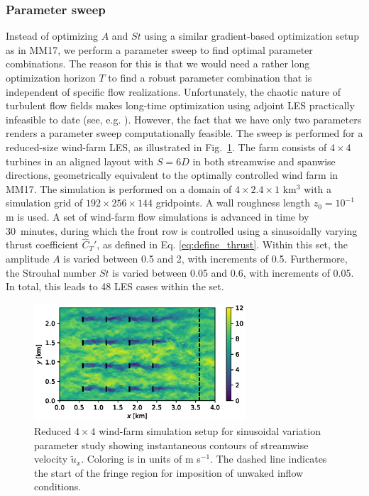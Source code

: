 \documentclass[wes, manuscript]{copernicus}
\begin{document}
\subsubsection{Parameter sweep}
Instead of optimizing $A$ and $St$ using a similar gradient-based optimization setup as in MM17, we perform a parameter sweep to find optimal parameter combinations. The reason for this is that we would need a rather long optimization horizon $T$ to find a robust parameter combination that is independent of specific flow realizations. Unfortunately, the chaotic nature of turbulent flow fields makes long-time optimization using adjoint LES practically infeasible to date (see, e.g. \citealp{wang2014least}). However, the fact that we have only two parameters renders a parameter sweep computationally feasible. The sweep is performed for a reduced-size wind-farm LES, as illustrated in Fig.~\ref{fig:sinus_setup}. The farm consists of $4 \times 4$ turbines in an aligned layout with $S = 6D$ in both streamwise and spanwise directions, geometrically equivalent to the optimally controlled wind farm in MM17. The simulation is performed on a domain of $4 \times 2.4 \times 1$ km$^3$ with a simulation grid of $192 \times 256 \times 144$ gridpoints. A wall roughness length $z_0 = 10^{-1}$ m is used. A set of wind-farm flow simulations is advanced in time by 30~minutes, during which the front row is controlled using a sinusoidally varying thrust coefficient $\widehat{C}_{T}'$, as defined in Eq. \eqref{eq:define_thrust}. Within this set, the amplitude $A$ is varied between 0.5 and 2, with increments of 0.5. Furthermore, the Strouhal number $St$ is varied between 0.05 and 0.6, with increments of 0.05. In total, this leads to 48 LES cases within the set. 

\begin{figure}
	\centering
	\includegraphics[width=0.7\textwidth]{figure13}
	\caption{Reduced $4 \times 4$ wind-farm simulation setup for sinusoidal variation parameter study showing instantaneous contours of streamwise velocity $\widetilde{u}_x$. Coloring is in units of m s$^{-1}$. The dashed line indicates the start of the fringe region for imposition of unwaked inflow conditions. \label{fig:sinus_setup}}
\end{figure}
\end{document}
